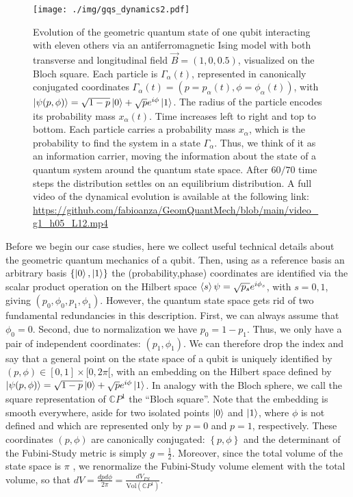 \documentclass[draft,nofootinbib,pre,twocolumn,showpacs,showkeys,preprintnumbers,floatfix]{revtex4-1}
\newcommand{\1}{\mathbbm{1}}
\begin{document}
\begin{figure}[t!]
\centering
\texttt{[image: ./img/gqs\_dynamics2.pdf]}
\caption{Evolution of the geometric quantum state of one qubit interacting with 
	eleven others via an antiferromagnetic Ising model with both transverse and longitudinal field $\vec{B} = (1,0,0.5)$, 
	visualized on the Bloch square. Each particle is $\Gamma_\alpha(t)$, represented in canonically conjugated 
	coordinates $\Gamma_\alpha(t) = \left( p=p_\alpha(t),\phi=\phi_\alpha(t)\right)$, with $\ket{\psi(p,\phi)} = 
	\sqrt{1-p} \ket{0}+ \sqrt{p} e^{i\phi}\ket{1}$. The radius of the particle encodes its 
	probability mass $x_\alpha(t)$. Time increases left to right and top to bottom. Each particle
	carries a probability mass $x_\alpha$, which is the probability to find the system in a 
	state $\Gamma_\alpha$. Thus, we think of it as an information carrier, moving the 
	information about the state of a quantum system around the quantum state space.
	After $60/70$ time steps the distribution settles on an equilibrium distribution. A full video 
	of the dynamical evolution is available at the following link: \url{https://github.com/fabioanza/GeomQuantMech/blob/main/video_g1_h05_L12.mp4}
	}
\label{fig:gqs_dynamics2}
\end{figure}

Before we begin our case studies, here we collect useful technical details
about the geometric quantum mechanics of a qubit. Then, using as a reference 
basis an arbitrary basis $\left\{ \ket{0},\ket{1}\right\}$ 
the (probability,phase) coordinates are identified via the scalar product operation
on the Hilbert space $\braket{s}{\psi} = \sqrt{p_s}e^{i\phi_s}$, with $s=0,1$, giving $(p_0,\phi_0,p_1,\phi_1)$. 
However, the quantum state space gets rid of two fundamental redundancies in this description.
First, we can always assume that $\phi_0 = 0$. Second, due to normalization we have
$p_0 = 1-p_1$. Thus, we only have a pair of independent coordinates: $(p_1,\phi_1)$.
We can therefore drop the index and say that a general point on the state space
of a qubit is uniquely identified by $(p,\phi) \in [0,1]\times[0,2\pi[$, with an embedding on the Hilbert space
defined by $\ket{\psi(p,\phi)} = \sqrt{1-p}\ket{0} + \sqrt{p}e^{i\phi}\ket{1}$. In analogy with 
the Bloch sphere, we call the square representation of $\mathbb{C}P^1$ the ``Bloch square''.
Note that the embedding is smooth everywhere, aside for two isolated points $\ket{0}$ and 
$\ket{1}$, where $\phi$ is not defined and which are represented only by $p=0$ and $p=1$, 
respectively. These coordinates $(p,\phi)$ are canonically conjugated: $\left\{ p,\phi\right\}$
and the determinant of the Fubini-Study metric is simply $g= \frac{1}{2}$. Moreover, since the total
volume of the state space is $\pi$ \cite{Bengtsson2017}, we renormalize the Fubini-Study volume element 
with the total volume, so that $dV = \frac{dpd\phi}{2\pi} = \frac{dV_{FS}}{\mathrm{Vol}(\mathbb{C}P^1)}$.
\end{document}
